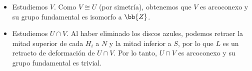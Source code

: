 \documentclass[12pt]{article}
\begin{document}
\begin{ejercicio}[2 puntos]
\begin{itemize}
\begin{figure}[h]
                \caption{Generador del grupo fundamental de $R$.}
                \label{fig:gen_retracto}
            \end{figure}

            Por lo tanto, $U$ es arcoconexo y su grupo fundamental es isomorfo a $\bb{Z}$.


            \item Estudiemos $V$. Como $V\cong U$ (por simetría), obtenemos que $V$ es arcoconexo y su grupo fundamental es isomorfo a $\bb{Z}$.


            \item Estudiemos $U\cap V$. Al haber eliminado los discos azules, podemos retraer la mitad superior de cada $H_i$ a $N$ y la mitad inferior a $S$, por lo que $L$ es un retracto de deformación de $U\cap V$. Por lo tanto, $U\cap V$ es arcoconexo y su grupo fundamental es trivial.
        \end{itemize}


\end{ejercicio}
\end{document}
